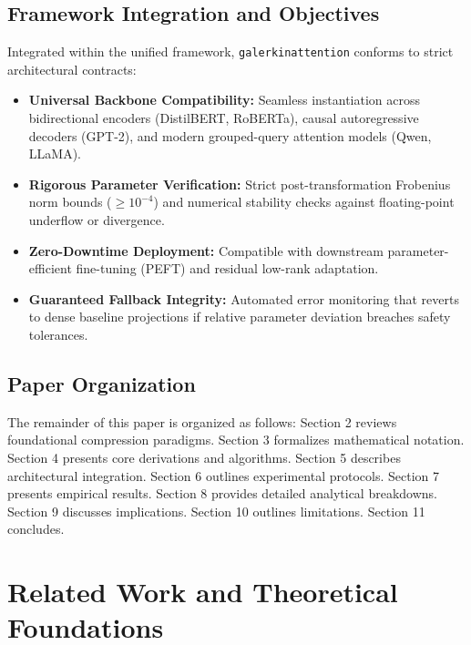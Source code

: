 \subsection{Framework Integration and Objectives}
Integrated within the unified framework, \texttt{galerkinattention} conforms to strict architectural contracts:
\begin{itemize}
\item \textbf{Universal Backbone Compatibility:} Seamless instantiation across bidirectional encoders (DistilBERT, RoBERTa), causal autoregressive decoders (GPT-2), and modern grouped-query attention models (Qwen, LLaMA).
\item \textbf{Rigorous Parameter Verification:} Strict post-transformation Frobenius norm bounds ($\ge 10^{-4}$) and numerical stability checks against floating-point underflow or divergence.
\item \textbf{Zero-Downtime Deployment:} Compatible with downstream parameter-efficient fine-tuning (PEFT) and residual low-rank adaptation.
\item \textbf{Guaranteed Fallback Integrity:} Automated error monitoring that reverts to dense baseline projections if relative parameter deviation breaches safety tolerances.
\end{itemize}

\subsection{Paper Organization}
The remainder of this paper is organized as follows: Section 2 reviews foundational compression paradigms. Section 3 formalizes mathematical notation. Section 4 presents core derivations and algorithms. Section 5 describes architectural integration. Section 6 outlines experimental protocols. Section 7 presents empirical results. Section 8 provides detailed analytical breakdowns. Section 9 discusses implications. Section 10 outlines limitations. Section 11 concludes.


\section{Related Work and Theoretical Foundations}


